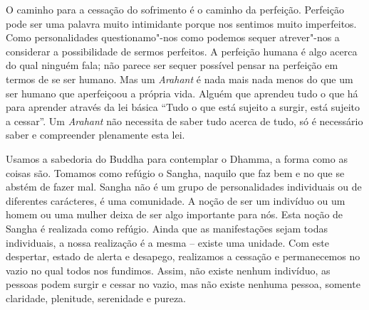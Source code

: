 O caminho para a cessação do sofrimento é o caminho da perfeição. Perfeição pode
ser uma palavra muito intimidante porque nos sentimos muito imperfeitos. Como
personalidades questionamo"-nos como podemos sequer atrever"-nos a considerar a
possibilidade de sermos perfeitos. A perfeição humana é algo acerca do qual
ninguém fala; não parece ser sequer possível pensar na perfeição em termos de se
ser humano. Mas um \emph{Arahant} é nada mais nada menos do que um ser humano que aperfeiçoou a própria vida. Alguém que aprendeu tudo o que há para aprender através da lei básica “Tudo o que está sujeito a surgir, está sujeito a cessar”. Um
\emph{Arahant} não necessita de saber tudo acerca de tudo, só é necessário saber
e compreender plenamente esta lei.

Usamos a sabedoria do Buddha para contemplar o Dhamma, a forma como as coisas
são. Tomamos como refúgio o Sangha, naquilo que faz bem e no que se abstém de
fazer mal. Sangha não é um grupo de personalidades individuais ou de diferentes
carácteres, é uma comunidade. A noção de ser um indivíduo ou um homem ou uma
mulher deixa de ser algo importante para nós. Esta noção de Sangha é realizada
como refúgio. Ainda que as manifestações sejam todas individuais, a nossa
realização é a mesma -- existe uma unidade. Com este despertar, estado de alerta e
desapego, realizamos a cessação e permanecemos no vazio no qual todos nos
fundimos. Assim, não existe nenhum indivíduo, as pessoas podem surgir e cessar
no vazio, mas não existe nenhuma pessoa, somente claridade, plenitude,
serenidade e pureza.

